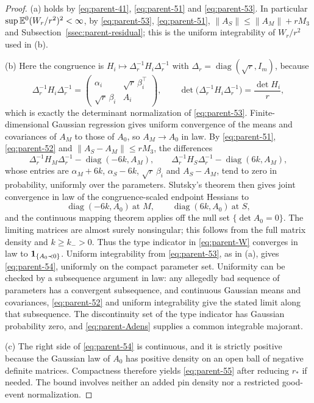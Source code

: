 \begin{proof}
(a) holds by \eqref{eq:parent-41}, \eqref{eq:parent-51} and \eqref{eq:parent-53}. In particular $\sup\mathbb E^0(W_r/r^2)^2<\infty$, by \eqref{eq:parent-53}, \eqref{eq:parent-51}, $\|A_S\|\le\|A_M\|+rM_3$ and Subsection~\ref{ssec:parent-residual}; this is the uniform integrability of $W_r/r^2$ used in (b).

(b) Here the congruence is $H_i\mapsto\Delta_r^{-1}H_i\Delta_r^{-1}$ with $\Delta_r=\operatorname{diag}(\sqrt r,I_m)$, because
\begin{equation}\label{eq:parent-congr}
\Delta_r^{-1}H_i\Delta_r^{-1}=\begin{pmatrix}\alpha_i&\sqrt r\,\beta_i^{\top}\\ \sqrt r\,\beta_i&A_i\end{pmatrix},\qquad \det\bigl(\Delta_r^{-1}H_i\Delta_r^{-1}\bigr)=\frac{\det H_i}r,
\end{equation}
which is exactly the determinant normalization of \eqref{eq:parent-53}. Finite-dimensional Gaussian regression gives uniform convergence of the means and covariances of $A_M$ to those of $A_0$, so $A_M\to A_0$ in law. By \eqref{eq:parent-51}, \eqref{eq:parent-52} and $\|A_S-A_M\|\le rM_3$, the differences
\[
\Delta_r^{-1}H_M\Delta_r^{-1}-\operatorname{diag}(-6k,A_M),\qquad \Delta_r^{-1}H_S\Delta_r^{-1}-\operatorname{diag}(6k,A_M),
\]
whose entries are $\alpha_M+6k$, $\alpha_S-6k$, $\sqrt r\,\beta_i$ and $A_S-A_M$, tend to zero in probability, uniformly over the parameters. Slutsky's theorem then gives joint convergence in law of the congruence-scaled endpoint Hessians to
\[
\operatorname{diag}(-6k,A_0)\ \text{at }M,\qquad \operatorname{diag}(6k,A_0)\ \text{at }S ,
\]
and the continuous mapping theorem applies off the null set $\{\det A_0=0\}$. The limiting matrices are almost surely nonsingular; this follows from the full matrix density and $k\ge k_->0$. Thus the type indicator in \eqref{eq:parent-W} converges in law to $\mathbf 1_{\{A_0\prec0\}}$. Uniform integrability from \eqref{eq:parent-53}, as in (a), gives \eqref{eq:parent-54}, uniformly on the compact parameter set. Uniformity can be checked by a subsequence argument in law: any allegedly bad sequence of parameters has a convergent subsequence, and continuous Gaussian means and covariances, \eqref{eq:parent-52} and uniform integrability give the stated limit along that subsequence. The discontinuity set of the type indicator has Gaussian probability zero, and \eqref{eq:parent-Adens} supplies a common integrable majorant.

(c) The right side of \eqref{eq:parent-54} is continuous, and it is strictly positive because the Gaussian law of $A_0$ has positive density on an open ball of negative definite matrices. Compactness therefore yields \eqref{eq:parent-55} after reducing $r_*$ if needed. The bound involves neither an added pin density nor a restricted good-event normalization.
\end{proof}

